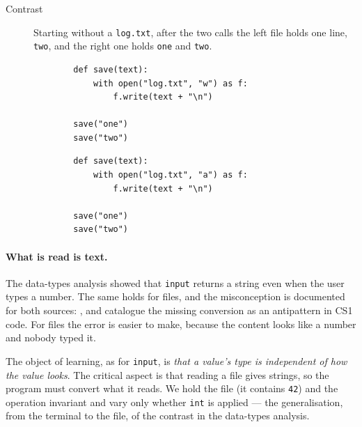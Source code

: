 \begin{description}
  \item[Contrast] Starting without a \texttt{log.txt}, after the two calls
    the left file holds one line, \texttt{two}, and the right one holds
    \texttt{one} and \texttt{two}.

    \hfill
    \begin{minipage}[t]{0.45\columnwidth}
      \begin{verbatim}
        def save(text):
            with open("log.txt", "w") as f:
                f.write(text + "\n")

        save("one")
        save("two")
      \end{verbatim}
    \end{minipage}
    \hfill
    \begin{minipage}[t]{0.45\columnwidth}
      \begin{verbatim}
        def save(text):
            with open("log.txt", "a") as f:
                f.write(text + "\n")

        save("one")
        save("two")
      \end{verbatim}
    \end{minipage}
\end{description}

\paragraph{What is read is text.}
The data-types analysis showed that \texttt{input} returns a
string even when the user types a number.
The same holds for files, and the misconception is documented for both
sources: , and
\textcite{Bosse2021Antipatterns} catalogue the missing conversion as an
antipattern in CS1 code.
For files the error is easier to make, because the content looks like a
number and nobody typed it.

The object of learning, as for \texttt{input}, is \emph{that a
value's type is independent of how the value looks}.
The critical aspect is that reading a file gives strings, so the program
must convert what it reads.
We hold the file (it contains \texttt{42}) and the operation invariant and
vary only whether \texttt{int} is applied --- the
generalisation, from the terminal to the file, of the contrast in the
data-types analysis.

